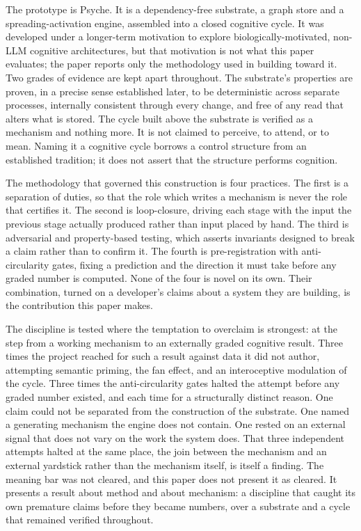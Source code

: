 \documentclass[11pt]{article}
\begin{document}
The prototype is Psyche.
It is a dependency-free substrate, a graph store and a spreading-activation
engine, assembled into a closed cognitive cycle. It was developed under a longer-term
motivation to explore biologically-motivated, non-LLM cognitive architectures, but that
motivation is not what this paper evaluates; the paper reports only the methodology used in
building toward it. Two grades of evidence are kept apart throughout. The substrate's
properties are proven, in a precise sense established later, to be deterministic across
separate processes, internally consistent through every change, and free of any read that
alters what is stored. The cycle built above the substrate is verified as a mechanism and
nothing more. It is not claimed to perceive, to attend, or to mean. Naming it a cognitive
cycle borrows a control structure from an established tradition; it does not assert that
the structure performs cognition.

The methodology that governed this construction is four practices. The first is a
separation of duties, so that the role which writes a mechanism is never the role that
certifies it. The second is loop-closure, driving each stage with the input the previous
stage actually produced rather than input placed by hand. The third is adversarial and
property-based testing, which asserts invariants designed to break a claim rather than to
confirm it. The fourth is pre-registration with anti-circularity gates, fixing a prediction
and the direction it must take before any graded number is computed. None of the four is
novel on its own. Their combination, turned on a developer's claims about a system they are
building, is the contribution this paper makes.

The discipline is tested where the temptation to overclaim is strongest: at the step from a
working mechanism to an externally graded cognitive result. Three times the project reached
for such a result against data it did not author, attempting semantic priming, the fan
effect, and an interoceptive modulation of the cycle. Three times the anti-circularity
gates halted the attempt before any graded number existed, and each time for a structurally
distinct reason. One claim could not be separated from the construction of the substrate.
One named a generating mechanism the engine does not contain. One rested on an external
signal that does not vary on the work the system does. That three independent attempts
halted at the same place, the join between the mechanism and an external yardstick rather
than the mechanism itself, is itself a finding. The meaning bar was not cleared, and this
paper does not present it as cleared. It presents a result about method and about
mechanism: a discipline that caught its own premature claims before they became numbers,
over a substrate and a cycle that remained verified throughout.
\end{document}
